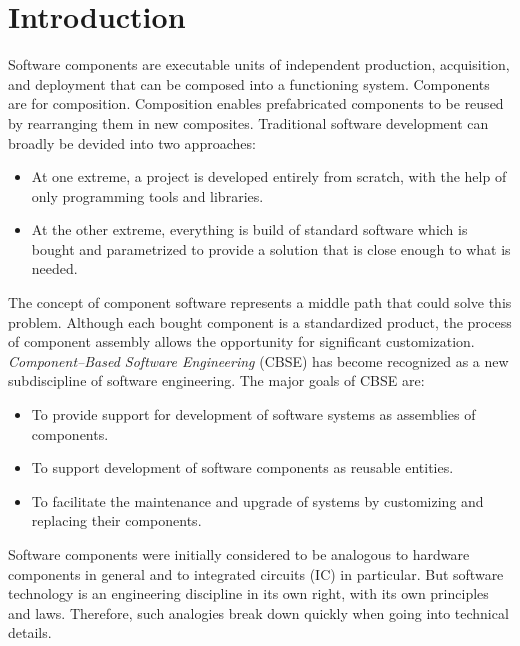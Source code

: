\section{Introduction}

Software components are executable units of independent production, acquisition,
and deployment that can be composed into a functioning system.
Components are for composition.
Composition enables prefabricated components to be reused by rearranging them 
in new composites.
Traditional software development can broadly be devided into two approaches:
\begin{itemize}
\item At one extreme, a project is developed entirely from scratch, with the
help of only programming tools and libraries.

\item At the other extreme, everything is build of standard software which
is bought and parametrized to provide a solution that is close enough to what
is needed.
\end{itemize}

\noindent 
The concept of component software represents a middle path that could solve 
this problem.
Although each bought component is a standardized product, the process of
component assembly allows the opportunity for significant customization.
{\it Component--Based Software Engineering} (CBSE) 
\cite{Szyperski02,IVICA2002,CBSE2001}
has become recognized as a new subdiscipline of software engineering. 
The major goals of CBSE are:
\begin{itemize}
\item To provide support for development of software systems as assemblies of
	components.
\item To support development of software components as reusable entities.
\item To facilitate the maintenance and upgrade of systems by customizing
   	and replacing their components.
\end{itemize}

\noindent
Software components were initially considered to be analogous to hardware
components in general and to integrated circuits (IC) in particular.
But software technology is an engineering discipline in its own right, with its
own principles and laws. Therefore, such analogies break down quickly when 
going into technical details.



